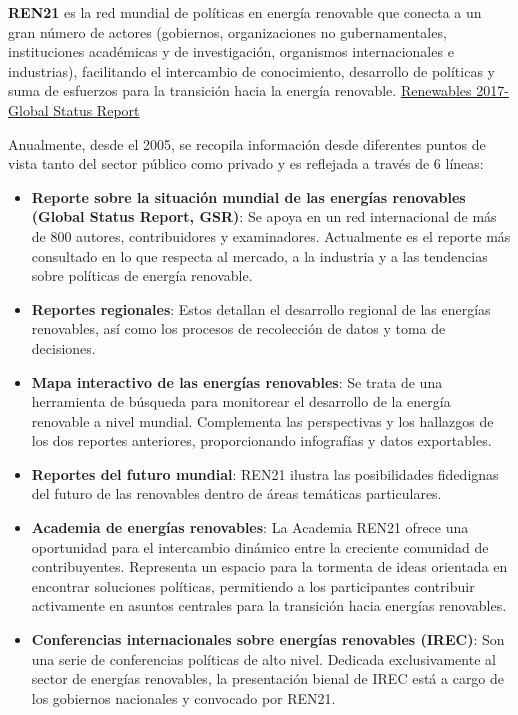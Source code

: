 \textbf{REN21} es la red mundial de políticas en energía renovable que
conecta a un gran número de actores (gobiernos, organizaciones no
gubernamentales, instituciones académicas y de investigación, organismos
internacionales e industrias), facilitando el intercambio de
conocimiento, desarrollo de políticas y suma de esfuerzos para la
transición hacia la energía renovable.
\href{http://www.ren21.net/wp-content/uploads/2017/06/17-8399_GSR_2017_Full_Report_0621_Opt.pdf}{Renewables
2017-Global Status Report}

Anualmente, desde el 2005, se recopila información desde diferentes
puntos de vista tanto del sector público como privado y es reflejada a
través de 6 líneas:

\begin{itemize}
\item
  \textbf{Reporte sobre la situación mundial de las energías renovables
  (Global Status Report, GSR)}: Se apoya en un red internacional de más
  de 800 autores, contribuidores y examinadores. Actualmente es el
  reporte más consultado en lo que respecta al mercado, a la industria y
  a las tendencias sobre políticas de energía renovable.
\item
  \textbf{Reportes regionales}: Estos detallan el desarrollo regional de
  las energías renovables, así como los procesos de recolección de datos
  y toma de decisiones.
\item
  \textbf{Mapa interactivo de las energías renovables}: Se trata de una
  herramienta de búsqueda para monitorear el desarrollo de la energía
  renovable a nivel mundial. Complementa las perspectivas y los
  hallazgos de los dos reportes anteriores, proporcionando infografías y
  datos exportables.
\item
  \textbf{Reportes del futuro mundial}: REN21 ilustra las posibilidades
  fidedignas del futuro de las renovables dentro de áreas temáticas
  particulares.
\item
  \textbf{Academia de energías renovables}: La Academia REN21 ofrece una
  oportunidad para el intercambio dinámico entre la creciente comunidad
  de contribuyentes. Representa un espacio para la tormenta de ideas
  orientada en encontrar soluciones políticas, permitiendo a los
  participantes contribuir activamente en asuntos centrales para la
  transición hacia energías renovables.
\item
  \textbf{Conferencias internacionales sobre energías renovables
  (IREC)}: Son una serie de conferencias políticas de alto nivel.
  Dedicada exclusivamente al sector de energías renovables, la
  presentación bienal de IREC está a cargo de los gobiernos nacionales y
  convocado por REN21.
\end{itemize}


